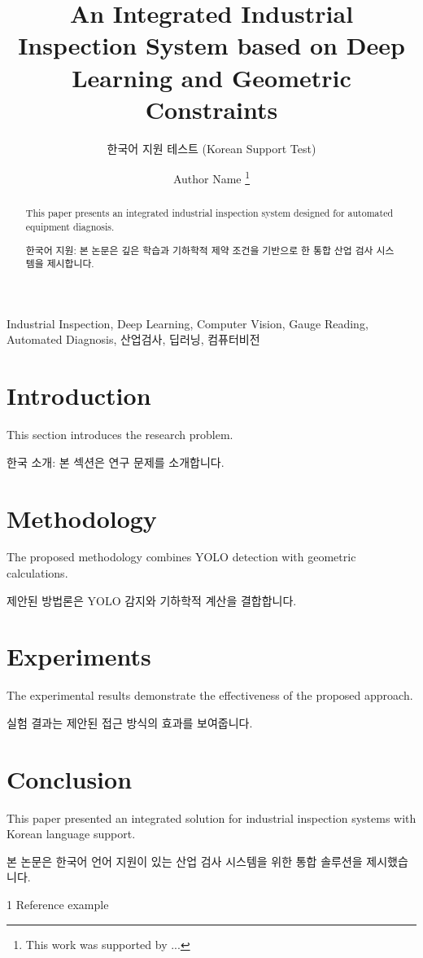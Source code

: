 \documentclass[journal]{IEEEtran}
\title{An Integrated Industrial Inspection System based on Deep Learning and Geometric Constraints}
\subtitle{한국어 지원 테스트 (Korean Support Test)}
\author{Author Name
\thanks{This work was supported by ...}}
\begin{document}
\maketitle

\begin{abstract}
This paper presents an integrated industrial inspection system designed for automated equipment diagnosis.

한국어 지원: 본 논문은 깊은 학습과 기하학적 제약 조건을 기반으로 한 통합 산업 검사 시스템을 제시합니다.
\end{abstract}

\begin{IEEEkeywords}
Industrial Inspection, Deep Learning, Computer Vision, Gauge Reading, Automated Diagnosis, 산업검사, 딥러닝, 컴퓨터비전
\end{IEEEkeywords}

\section{Introduction}
\label{sec:intro}

This section introduces the research problem.

한국 소개: 본 섹션은 연구 문제를 소개합니다.

\section{Methodology}
\label{sec:method}

The proposed methodology combines YOLO detection with geometric calculations.

제안된 방법론은 YOLO 감지와 기하학적 계산을 결합합니다.

\section{Experiments}
\label{sec:exp}

The experimental results demonstrate the effectiveness of the proposed approach.

실험 결과는 제안된 접근 방식의 효과를 보여줍니다.

\section{Conclusion}
\label{sec:conclusion}

This paper presented an integrated solution for industrial inspection systems with Korean language support.

본 논문은 한국어 언어 지원이 있는 산업 검사 시스템을 위한 통합 솔루션을 제시했습니다.

\begin{thebibliography}{1}
 Reference example
\end{thebibliography}
\end{document}
